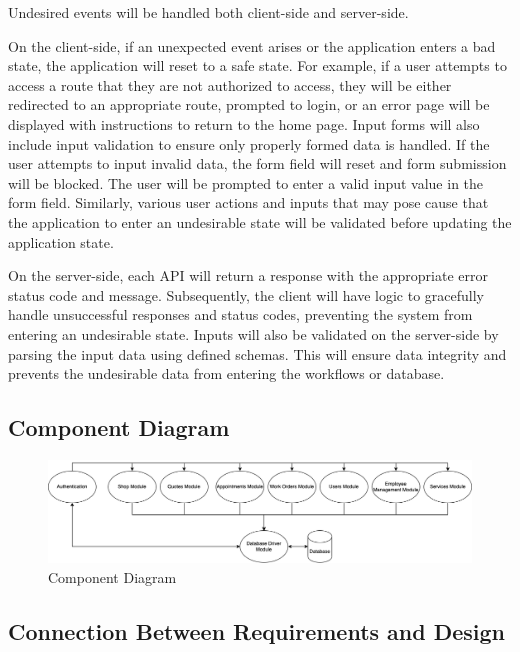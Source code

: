 \documentclass[12pt, titlepage]{article}
\begin{document}
Undesired events will be handled both client-side and server-side.

On the client-side, if an unexpected event arises or the application enters a bad state, the
application will reset to a safe state. For example, if a user attempts to access a route that they
are not authorized to access, they will be either redirected to an appropriate route, prompted to
login, or an error page will be displayed with instructions to return to the home page. Input forms
will also include input validation to ensure only properly formed data is handled. If the user
attempts to input invalid data, the form field will reset and form submission will be blocked. The
user will be prompted to enter a valid input value in the form field. Similarly, various user
actions and inputs that may pose cause that the application to enter an undesirable state will be
validated before updating the application state.

On the server-side, each API will return a response with the appropriate error status code and
message. Subsequently, the client will have logic to gracefully handle unsuccessful responses and
status codes, preventing the system from entering an undesirable state. Inputs will also be
validated on the server-side by parsing the input data using defined schemas. This will ensure data
integrity and prevents the undesirable data from entering the workflows or database.

\subsection{Component Diagram}

\begin{figure}[H]
	\centering
	\includegraphics[width=\textwidth]{./diagrams/component-diagram.png}
	\caption{Component Diagram}
	\label{ComponentDiagram}
\end{figure}

\subsection{Connection Between Requirements and Design} \label{SecConnection}
\end{document}
